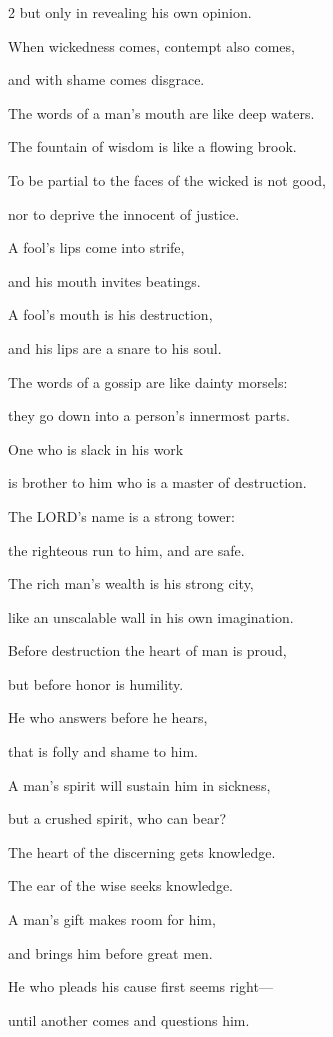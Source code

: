 \begin{multicols}{2}
but only in revealing his own opinion.


\myverse{}When wickedness comes, contempt also comes,

and with shame comes disgrace.


\myverse{}The words of a man’s mouth are like deep waters.

The fountain of wisdom is like a flowing brook.


\myverse{}To be partial to the faces of the wicked is not good,

nor to deprive the innocent of justice.


\myverse{}A fool’s lips come into strife,

and his mouth invites beatings.


\myverse{}A fool’s mouth is his destruction,

and his lips are a snare to his soul.


\myverse{}The words of a gossip are like dainty morsels:

they go down into a person’s innermost parts.


\myverse{}One who is slack in his work

is brother to him who is a master of destruction.


\myverse{}The LORD’s name is a strong tower:

the righteous run to him, and are safe.


\myverse{}The rich man’s wealth is his strong city,

like an unscalable wall in his own imagination.


\myverse{}Before destruction the heart of man is proud,

but before honor is humility.


\myverse{}He who answers before he hears,

that is folly and shame to him.


\myverse{}A man’s spirit will sustain him in sickness,

but a crushed spirit, who can bear?


\myverse{}The heart of the discerning gets knowledge.

The ear of the wise seeks knowledge.


\myverse{}A man’s gift makes room for him,

and brings him before great men.


\myverse{}He who pleads his cause first seems right—

until another comes and questions him.



\end{multicols}
